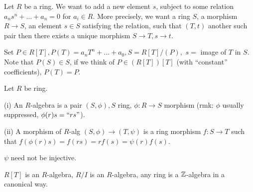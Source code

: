 Let $R$ be a ring. We want to add a new element $s$, subject to some relation $a_ns^n+\ldots+a_n=0$ for $a_i\in R$. More precisely, we want a ring $S$, a morphism $R\longrightarrow S$, an element $s\in S$ satisfying the relation, such that $(T,t)$ another such pair then there exists a unique morphism $S\longrightarrow T,s\longrightarrow t$.

Set $P\in R[T], P(T)=a_nT^n+\ldots+a_0, S=R[T]/(P),$ $s=$ image of $T$ in $S$. Note that $P(S)\in S$, if we think of $P\in (R[T])[T]$ (with ``constant'' coefficients), $P(T)=P.$
\begin{defn}\label{Defn 5, Jan 25}
Let $R$ be ring.

(i) An $R$-algebra is a pair $(S,\phi), S$ ring, $\phi:R\longrightarrow S$ morphism (rmk: $\phi$ usually suppressed, $\phi(r)s=``rs"$).

(ii) A morphism of $R$-alg $(S,\phi)\longrightarrow (T,\psi)$ is a ring morphism $f:S\longrightarrow T$ such that $f(\phi(r)s)=f(rs)=rf(s)=\psi(r)f(s)$.
\end{defn}
\begin{rmk}
$\psi$ need not be injective.
\end{rmk}
\begin{ex}
$R[T]$ is an $R$-algebra, $R/I$ is an $R$-algebra, any ring is a $\mathbb{Z}$-algebra in a canonical way.
\end{ex}
